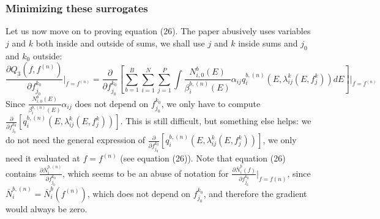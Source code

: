 \documentclass[a4paper, 10pt]{article}
\begin{document}
\subsubsection{Minimizing these surrogates}
Let us now move on to proving equation (26). The paper abusively uses variables $j$ and $k$ both inside and outside of sums, we shall use $j$ and $k$ inside sums and $j_0$ and $k_0$ outside:
\begin{equation*}
  \frac{\partial Q_3\left( f,f^{(n)}\right)}{\partial f_{j_0}^{k_0}}\Bigr|_{f = f^{(n)}} = \frac{\partial }{\partial f_{j_0}^{k_0}}\left[ \sum_{b=1}^B \sum_{i=1}^N \sum_{j=1}^P \int \frac{N_{i,0}^b(E)}{\beta_i^{b, (n)}(E)} \alpha_{ij} q_i^{b, (n)}\left(E, \lambda_{ij}^k\left( E, f_j^k\right)\right) dE \right]\Bigr|_{f = f^{(n)}}
\end{equation*}
Since $\frac{N_{i,0}^b(E)}{\beta_i^{b, (n)}(E)} \alpha_{ij}$ does not depend on $f_{j_0}^{k_0}$, we only have to compute $\frac{\partial }{\partial f_{j_0}^{k_0}} \left[ q_i^{b, (n)}\left(E, \lambda_{ij}^k\left( E, f_j^k\right)\right) \right]$.
This is still difficult, but something else helps: we do not need the general expression of $\frac{\partial }{\partial f_{j_0}^{k_0}} \left[ q_i^{b, (n)}\left(E, \lambda_{ij}^k\left( E, f_j^k\right)\right) \right]$, we only need it 
evaluated at $f = f^{(n)}$ (see equation (26)). Note that equation (26) contains $\frac{\partial \bar{N}_i^{b, (n)}}{\partial f_{j_0}^{k_0}}$, which seems to be an abuse of notation for 
$\frac{\partial \bar{N}_i^{b}(f)}{\partial f_{j_0}^{k_0}}\Bigr|_{f = f{(n)}}$, since $\bar{N}_i^{b, (n)} = \bar{N}_i^{b}(f^{(n)})$, which does not depend on $f_{j_0}^{k_0}$, and therefore 
the gradient would always be zero. 
\end{document}
